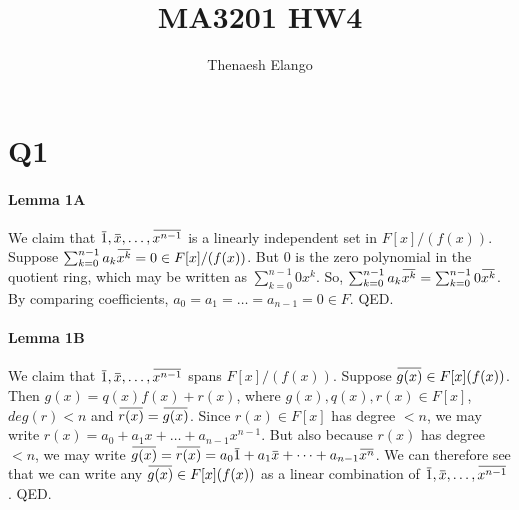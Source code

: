 \documentclass[]{article}
\title{MA3201 HW4}
\author{Thenaesh Elango}
\begin{document}
\newcommand{\overbar}[1]{\mkern 1.5mu\overline{\mkern-1.5mu#1\mkern-1.5mu}\mkern 1.5mu}
\newcommand{\gaussint}{\mathbb{Z}[i]}
\maketitle

\section*{Q1}
	\paragraph{Lemma 1A}
	We claim that $\overbar{1}, \overbar{x}, \dots, \overbar{x^{n-1}}$ is a linearly independent set in $F[x]/(f(x))$.\newline
	Suppose $\sum_{k=0}^{n-1} a_k\overbar{x^k} = 0 \in F[x]/(f(x))$.\newline
	But $0$ is the zero polynomial in the quotient ring, which may be written as $\sum_{k=0}^{n-1} 0x^k$.\newline
	So, $\sum_{k=0}^{n-1} a_k\overbar{x^k} = \sum_{k=0}^{n-1} 0\overbar{x^k}$.\newline
	By comparing coefficients, $a_0 = a_1 = \dots = a_{n-1} = 0 \in F$.\newline
	QED.
	\paragraph{Lemma 1B}
	We claim that $\overbar{1}, \overbar{x}, \dots, \overbar{x^{n-1}}$ spans $F[x]/(f(x))$.\newline
	Suppose $\overbar{g(x)} \in F[x](f(x))$.\newline
	Then $g(x) = q(x)f(x) + r(x)$, where $g(x), q(x), r(x) \in F[x]$, $deg(r) < n$ and $\overbar{r(x)} = \overbar{g(x)}$.\newline
	Since $r(x) \in F[x]$ has degree $< n$, we may write $r(x) = a_0 + a_1x + \dots + a_{n-1}x^{n-1}$.\newline
	But also because $r(x)$ has degree $< n$, we may write $\overbar{g(x)} = \overbar{r(x)} = a_0\overbar{1} + a_1\overbar{x} + \dots + a_{n-1}\overbar{x^n}$.\newline
	We can therefore see that we can write any $\overbar{g(x)} \in F[x](f(x))$ as a linear combination of $\overbar{1}, \overbar{x}, \dots, \overbar{x^{n-1}}$.\newline
	QED.
\end{document}
